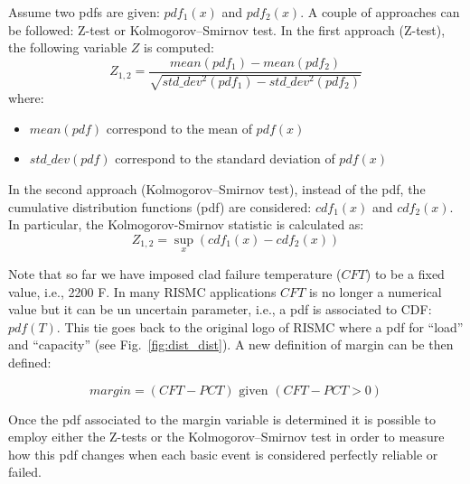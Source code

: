 Assume two pdfs are given: $pdf_1(x)$ and $pdf_2(x)$. A couple of approaches can be followed: Z-test or 
Kolmogorov–Smirnov test. 
In the first approach (Z-test), the following variable $Z$ is computed:
\begin{equation}
  Z_{1,2} = \frac{mean(pdf_1)-mean(pdf_2)}{\sqrt{std\_dev^2 (pdf_1)-std\_dev^2(pdf_2)}} 
  \label{eq:Ztest}
\end{equation}
where:
\begin{itemize}
  \item $mean(pdf)$ correspond to the mean of $pdf(x)$ 
  \item $std\_dev(pdf)$ correspond to the standard deviation of $pdf(x)$ 
\end{itemize}

In the second approach (Kolmogorov–Smirnov test), instead of the pdf, the cumulative 
distribution functions (pdf) are considered: $cdf_1(x)$ and $cdf_2(x)$. 
In particular, the Kolmogorov-Smirnov statistic is calculated as:
\begin{equation}
  Z_{1,2} = \sup_{x} (cdf_1(x) - cdf_2(x))
  \label{eq:Kolmogorov-Smirnov}
\end{equation}

Note that so far we have imposed clad failure temperature ($CFT$) to be a fixed value, 
i.e., 2200 F. 
In many RISMC applications $CFT$ is no longer a numerical value but it can be un uncertain 
parameter, i.e., a pdf is associated to CDF: $pdf(T)$. 
This tie goes back to the original logo of RISMC where a pdf for ``load'' and ``capacity'' 
(see Fig.~\ref{fig:dist_dist}).
A new definition of margin can be then defined:

\begin{equation}
  margin=(CFT-PCT) \text{ given } (CFT-PCT>0)
  \label{eq:new margin}
\end{equation}

Once the pdf associated to the margin variable is determined it is possible 
to employ either the Z-tests or the Kolmogorov–Smirnov test in order to measure how this pdf 
changes when each basic event is considered perfectly reliable or failed. 
